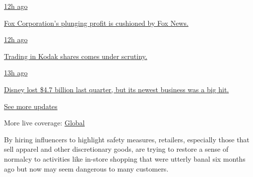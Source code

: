 \href{https://www.nytimes3xbfgragh.onion/live/2020/08/04/business/stock-market-today-coronavirus?action=click\&pgtype=Article\&state=default\&region=MAIN_CONTENT_1\&context=storylines_live_updates\#fox-corporations-plunging-profit-is-cushioned-by-fox-news}{12h
ago}

\href{https://www.nytimes3xbfgragh.onion/live/2020/08/04/business/stock-market-today-coronavirus?action=click\&pgtype=Article\&state=default\&region=MAIN_CONTENT_1\&context=storylines_live_updates\#fox-corporations-plunging-profit-is-cushioned-by-fox-news}{Fox
Corporation's plunging profit is cushioned by Fox News.}

\href{https://www.nytimes3xbfgragh.onion/live/2020/08/04/business/stock-market-today-coronavirus?action=click\&pgtype=Article\&state=default\&region=MAIN_CONTENT_1\&context=storylines_live_updates\#trading-in-kodak-shares-comes-under-scrutiny}{12h
ago}

\href{https://www.nytimes3xbfgragh.onion/live/2020/08/04/business/stock-market-today-coronavirus?action=click\&pgtype=Article\&state=default\&region=MAIN_CONTENT_1\&context=storylines_live_updates\#trading-in-kodak-shares-comes-under-scrutiny}{Trading
in Kodak shares comes under scrutiny.}

\href{https://www.nytimes3xbfgragh.onion/live/2020/08/04/business/stock-market-today-coronavirus?action=click\&pgtype=Article\&state=default\&region=MAIN_CONTENT_1\&context=storylines_live_updates\#disney-lost-4-7-billion-last-quarter-but-its-newest-business-was-a-big-hit}{13h
ago}

\href{https://www.nytimes3xbfgragh.onion/live/2020/08/04/business/stock-market-today-coronavirus?action=click\&pgtype=Article\&state=default\&region=MAIN_CONTENT_1\&context=storylines_live_updates\#disney-lost-4-7-billion-last-quarter-but-its-newest-business-was-a-big-hit}{Disney
lost \$4.7 billion last quarter, but its newest business was a big hit.}

\href{https://www.nytimes3xbfgragh.onion/live/2020/08/04/business/stock-market-today-coronavirus?action=click\&pgtype=Article\&state=default\&region=MAIN_CONTENT_1\&context=storylines_live_updates}{See
more updates}

More live coverage:
\href{https://www.nytimes3xbfgragh.onion/2020/08/04/world/coronavirus-cases.html?action=click\&pgtype=Article\&state=default\&region=MAIN_CONTENT_1\&context=storylines_live_updates}{Global}

By hiring influencers to highlight safety measures, retailers,
especially those that sell apparel and other discretionary goods, are
trying to restore a sense of normalcy to activities like in-store
shopping that were utterly banal six months ago but now may seem
dangerous to many customers.

